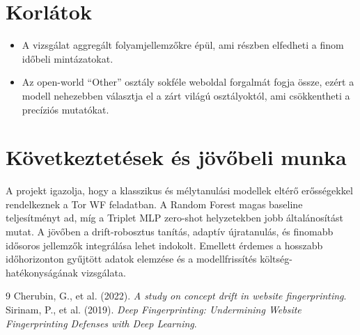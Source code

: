 \documentclass[a4paper,12pt]{article}
\begin{document}
\section{Korlátok}
\begin{itemize}
    \item A vizsgálat aggregált folyamjellemzőkre épül, ami részben elfedheti a finom időbeli mintázatokat.
    \item Az open-world ``Other'' osztály sokféle weboldal forgalmát fogja össze, ezért a modell
    nehezebben választja el a zárt világú osztályoktól, ami csökkentheti a precíziós mutatókat.
\end{itemize}

\section{Következtetések és jövőbeli munka}
A projekt igazolja, hogy a klasszikus és mélytanulási modellek eltérő erősségekkel rendelkeznek
a Tor WF feladatban. A Random Forest magas baseline teljesítményt ad, míg a Triplet MLP
zero-shot helyzetekben jobb általánosítást mutat. A jövőben a drift-robosztus tanítás,
adaptív újratanulás, és finomabb idősoros jellemzők integrálása lehet indokolt. Emellett
érdemes a hosszabb időhorizonton gyűjtött adatok elemzése és a modellfrissítés költség-hatékonyságának
vizsgálata.

\begin{thebibliography}{9}
    Cherubin, G., et al. (2022). \textit{A study on concept drift in website fingerprinting}.
    Sirinam, P., et al. (2019). \textit{Deep Fingerprinting: Undermining Website Fingerprinting Defenses with Deep Learning}.
\end{thebibliography}
\end{document}
